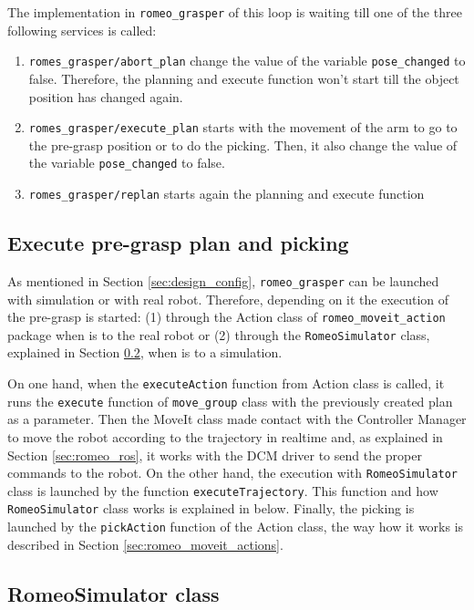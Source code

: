 \documentclass[12pt,a4paper,final,twoside,openright]{report}
\begin{document}
The implementation in \texttt{romeo\_grasper} of this loop is waiting till one of the three following services is called:
\begin{enumerate}
\item \texttt{romes\_grasper/abort\_plan} change the value of the variable \texttt{pose\_changed} to false. Therefore, the planning and execute function won't start till the object position has changed again.
\item \texttt{romes\_grasper/execute\_plan} starts with the movement of the arm to go to the pre-grasp position or to do the picking. Then, it also change the value of the variable \texttt{pose\_changed} to false.
\item \texttt{romes\_grasper/replan} starts again the planning and execute function
\end{enumerate}

\subsection{Execute pre-grasp plan and picking}

As mentioned in Section \ref{sec:design_config}, \texttt{romeo\_grasper} can be launched with simulation or with real robot. Therefore, depending on it the execution of the pre-grasp is started: (1) through the Action class of \texttt{romeo\_moveit\_action} package when is to the real robot or (2) through the \texttt{RomeoSimulator} class, explained in Section \ref{sec:romeo_simulator}, when is to a simulation. 

On one hand, when the \texttt{executeAction} function from Action class is called, it runs the \texttt{execute} function of \texttt{move\_group} class with the previously created plan as a parameter. Then the MoveIt class made contact with the Controller Manager to move the robot according to the trajectory in realtime and, as explained in Section \ref{sec:romeo_ros}, it works with the DCM driver to send the proper commands to the robot. On the other hand, the execution with \texttt{RomeoSimulator} class is launched by the function \texttt{executeTrajectory}. This function and how \texttt{RomeoSimulator} class works is explained in below. Finally, the picking is launched by the \texttt{pickAction} function of the Action class, the way how it works is described in Section \ref{sec:romeo_moveit_actions}.

\subsection{RomeoSimulator class}
\label{sec:romeo_simulator}
\end{document}
